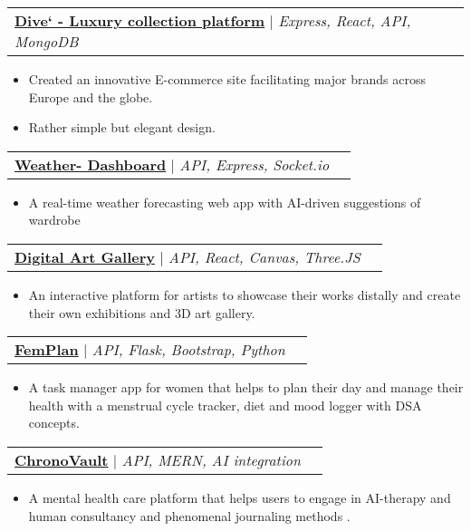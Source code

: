 \documentclass[letterpaper,11pt]{article}
\makeatletter
\newcommand{\resumeItem}[1]{
  \item\small{
    {#1 \vspace{-2pt}}
  }
}
\newcommand{\resumeProjectHeading}[2]{
    \item
    \begin{tabular*}{1.001\textwidth}{l@{\extracolsep{\fill}}r}
      \small#1 & \textbf{\small #2}\\
    \end{tabular*}\vspace{-7pt}
}
\newcommand{\resumeItemListStart}{\begin{itemize}}
\newcommand{\resumeItemListEnd}{\end{itemize}\vspace{-5pt}}
\makeatother
\begin{document}
         \resumeProjectHeading
         {\textbf{\href{https://github.com/PoojasPatel013}{\textcolor{maincolor}{Dive` - Luxury collection platform}}} $|$ \emph{Express, React, API, MongoDB}}{}
         \resumeItemListStart
              \resumeItem{Created an innovative E-commerce site facilitating major brands across Europe and the globe.}
              \resumeItem{Rather simple but elegant design.}
         \resumeItemListEnd 
         \vspace{-13pt}
         
         \resumeProjectHeading
         {\textbf{\href{https://github.com/PoojasPatel013}{\textcolor{maincolor}{Weather- Dashboard}}} $|$ \emph{API, Express, Socket.io}}{}
         \resumeItemListStart
           \resumeItem{A real-time weather forecasting web app with AI-driven suggestions of wardrobe}
           
         \resumeItemListEnd 
         \vspace{-13pt}

         \resumeProjectHeading
         {\textbf{\href{https://github.com/PoojasPatel013}{\textcolor{maincolor}{Digital Art Gallery}}} $|$ \emph{API, React, Canvas, Three.JS}}{}
         \resumeItemListStart
           \resumeItem{An interactive platform for artists to showcase their works distally and create their own exhibitions and 3D art gallery.}
           
         \resumeItemListEnd 
         \vspace{-13pt}

          \resumeProjectHeading
         {\textbf{\href{https://github.com/PoojasPatel013}{\textcolor{maincolor}{FemPlan}}} $|$ \emph{API, Flask, Bootstrap, Python}}{}
         \resumeItemListStart
           \resumeItem{A task manager app for women that helps to plan their day and manage their health with a menstrual cycle tracker, diet and mood logger with DSA concepts.}
           
         \resumeItemListEnd 
         \vspace{-13pt}

         \resumeProjectHeading
         {\textbf{\href{https://github.com/PoojasPatel013}{\textcolor{maincolor}{ChronoVault}}} $|$ \emph{API, MERN, AI integration}}{}
         \resumeItemListStart
           \resumeItem{A mental health care platform that helps users to engage in AI-therapy and human consultancy and phenomenal journaling methods .}
           
         \resumeItemListEnd 
         \vspace{-13pt}
\end{document}
